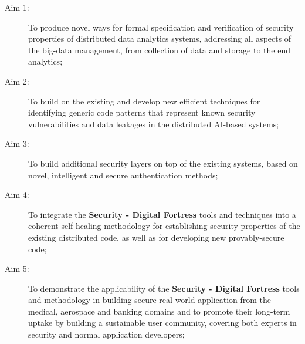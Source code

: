 \documentclass[a4paper,11pt]{article}
\newcommand{\project}[1]{\textbf{#1}\xspace}
\newcommand{\SECURITY}{\project{Security - Digital Fortress}}
\newcommand{\TheProject}{\SECURITY}
\begin{document}
\begin{description}
\item[Aim 1:] To produce novel ways for formal specification and verification of security properties of
  distributed data analytics systems, addressing all aspects of the big-data management, from collection of
  data and storage to the end analytics;

\item[Aim 2:] To build on the existing and develop new efficient techniques for identifying generic code patterns that
  represent known security vulnerabilities and data leakages in the distributed AI-based systems;

\item[Aim 3:] To build additional security layers on top of the existing systems, based on novel, intelligent and secure authentication methods;

\item[Aim 4:] To integrate the \TheProject{} tools and techniques into a coherent self-healing methodology for establishing
  security properties of the existing distributed code, as well as for developing new provably-secure code;

\item[Aim 5:]  To demonstrate the applicability of the \TheProject{} tools and
 methodology in building secure real-world application from the medical, aerospace and
 banking domains and to promote their long-term uptake by building a sustainable user community,
 covering both experts in security and normal application developers;

\end{description}
\end{document}
